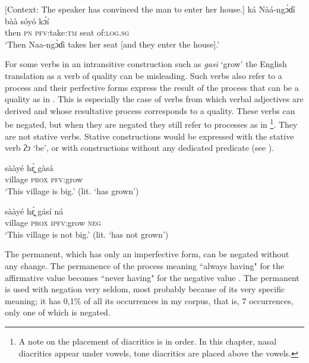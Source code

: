 \documentclass[output=paper,colorlinks=true, citecolor=brown]{langscibook}
\begin{document}
\ea\label{ex:gba:3}[Context: The speaker has convinced the man to enter her house.]\newline
    \gll ká Nàá-ngɔ̀ɗí bàà sóyó kɔ́í \\ 
         then \textsc{pn} \textsc{pfv}:take:\textsc{tm} seat of:\textsc{log.sg}  \\
    \glt ‘Then Naa-ngɔ̀ɗi takes her seat [and they enter the house].’
\z 

For some verbs in an intransitive construction such as \textit{gasi} ‘grow’  the English translation as a verb of quality can be misleading. Such verbs also refer to a process and their perfective forms express the result of the process that can be a quality as in . This is especially the case of verbs from which verbal adjectives are derived and whose resultative process corresponds to a quality. These verbs can be negated, but when they are negated they still refer to processes as in \footnote{A note on the placement of diacritics is in order. In this chapter, nasal diacritics appear under vowels, tone diacritics are placed above the vowels.}. They are not stative verbs. Stative constructions would be expressed with the stative verb \textit{ʔɔ} ‘be’, or with constructions without any dedicated predicate (see ).

\ea\label{ex:gba:4}
    \gll sààyé hɛ̰̰̀ gàsá\\ 
         village \textsc{prox} \textsc{pfv}:grow \\
    \glt ‘This village is big.’ (lit. ‘has grown’)
\z 
 
\ea\label{ex:gba:5}
    \gll sààyé hɛ̰̰̀ gásí ná  \\ 
        village \textsc{prox} \textsc{ipfv}:grow \textsc{neg} \\
    \glt ‘This village is not big.’ (lit. ‘has not grown’)
\z 

The permanent, which has only an imperfective form, can be negated without any change. The permanence of the process meaning “always having" for the affirmative value  becomes “never having" for the negative value . The permanent is used with negation very seldom, most probably because of its very specific meaning; it has 0,1\% of all its occurrences in my corpus, that is, 7 occurrences, only one of which is negated.
\end{document}
